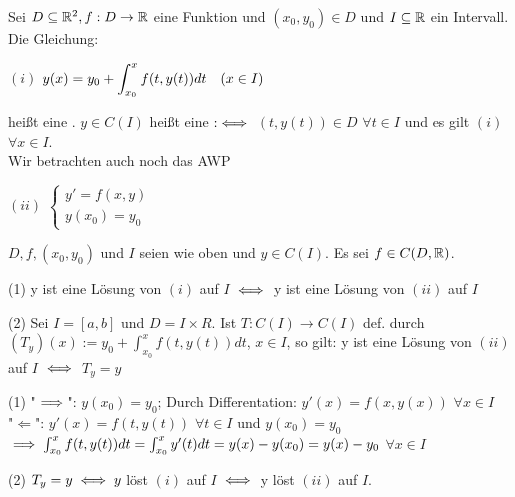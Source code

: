 \documentclass[a4paper,twoside,DIV15,BCOR12mm]{scrbook}
\begin{document}
\begin{definition}
Sei $D \subseteq \mathbb{R}^2, f:D \to \mathbb{R}$ eine Funktion und $(x_0, y_0) \in D$ und $I \subseteq \mathbb{R}$ ein Intervall. Die Gleichung:
\begin{liste}
\item[$(i)$] $\displaystyle y(x) = y_0 + \int_{x_0}^{x} f(t,y(t)) dt \quad (x \in I)$
\end{liste} 
\end{definition} 
heißt eine . $y \in C(I)$ heißt eine  $:\iff$ $(t,y(t)) \in D$ $\forall t \in I$ 
und es gilt $(i)$ $\forall x \in I$. \\
Wir betrachten auch noch das AWP 
\begin{liste}
\item[$(ii)$] $\begin{cases} y' = f(x,y) \\ y(x_0) = y_0 \end{cases}$
\end{liste} 

\begin{satz}
$D,f,(x_0,y_0)$ und $I$ seien wie oben und $y \in C(I)$. Es sei $f \in C(D,\mathbb{R}) $.
\begin{liste}
\item[(1)] y ist eine Lösung von $(i)$ auf $I$ $\iff$ y ist eine Lösung von $(ii)$ auf $I$
\item[(2)] Sei $I=[a,b]$ und $D= I \times R$. Ist $T: C(I) \to C(I)$ def. durch $(T_y)(x) := y_0+\int_{x_0}^{x} f(t,y(t)) dt$, $x \in I$, so gilt:
y ist eine Lösung von $(ii)$ auf $I$ $\iff$ $T_y = y$
\end{liste} 
\end{satz}

\begin{beweis}
\begin{liste}
\item[(1)] "$\implies$": $y(x_0) = y_0$; Durch Differentation: $y'(x) = f(x,y(x))$ $\forall x \in I$ \\
"$\Leftarrow$": $y'(x) = f(t,y(t))$ $\forall t \in I$ und $y(x_0) = y_0$ $\implies \int_{x_0}^{x} f(t,y(t)) dt = \int_{x_0}^{x} y'(t) dt = y(x)-y(x_0) = y(x) - y_0$ $\forall x \in I$ 
\item[(2)] $T_y = y \iff y$ löst $(i)$ auf $I$ $\iff$ y löst $(ii)$ auf $I$.
\end{liste} 
\end{beweis}
\end{document}
